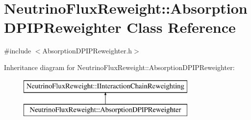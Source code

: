 \hypertarget{class_neutrino_flux_reweight_1_1_absorption_d_p_i_p_reweighter}{\section{Neutrino\-Flux\-Reweight\-:\-:Absorption\-D\-P\-I\-P\-Reweighter Class Reference}
\label{class_neutrino_flux_reweight_1_1_absorption_d_p_i_p_reweighter}
}


{\ttfamily \#include $<$Absorption\-D\-P\-I\-P\-Reweighter.\-h$>$}

Inheritance diagram for Neutrino\-Flux\-Reweight\-:\-:Absorption\-D\-P\-I\-P\-Reweighter\-:\begin{figure}[H]
\begin{center}
\leavevmode
\includegraphics[height=2.000000cm]{class_neutrino_flux_reweight_1_1_absorption_d_p_i_p_reweighter}
\end{center}
\end{figure}
